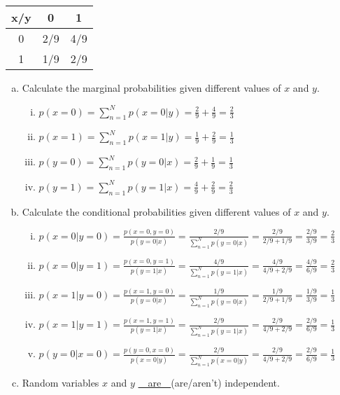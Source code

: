 \documentclass[11pt]{article} %
\begin{document}
\begin{center}
\begin{tabular}{c | c c}
x/y & 0 & 1 \\
\hline
0 & 2/9 & 4/9 \\
1 & 1/9 & 2/9
\end{tabular}
\end{center}

\begin{enumerate}[(a)]
\item Calculate the marginal probabilities given different values of $x$ and $y$.
\begin{enumerate}[i. ]
\item $p(x = 0) = \sum_{n=1}^{N} p(x=0|y) = \frac{2}{9} + \frac{4}{9} = \frac{2}{3}$
\item $p(x=1) = \sum_{n=1}^{N} p(x=1|y) = \frac{1}{9} + \frac{2}{9} = \frac{1}{3}$
\item $p(y=0) = \sum_{n=1}^{N} p(y=0|x) = \frac{2}{9} + \frac{1}{9} = \frac{1}{3}$
\item $p(y=1) = \sum_{n=1}^{N} p(y=1|x) = \frac{4}{9} + \frac{2}{9} = \frac{2}{3}$
\end{enumerate}
\item Calculate the conditional probabilities given different values of $x$ and $y$.
\begin{enumerate}[i. ]
\item $p(x=0|y=0) = \frac{p(x=0,y=0)}{p(y=0|x)} = \frac{2/9}{\sum_{n=1}^{N} p(y=0|x)} = \frac{2/9}{2/9 + 1/9} = \frac{2/9}{3/9} = \frac{2}{3}$
\item $p(x=0|y=1) = \frac{p(x=0,y=1)}{p(y=1|x)} = \frac{4/9}{\sum_{n=1}^{N} p(y=1|x)} = \frac{4/9}{4/9 + 2/9} = \frac{4/9}{6/9} = \frac{2}{3}$
\item $p(x=1|y=0) = \frac{p(x=1,y=0)}{p(y=0|x)} = \frac{1/9}{\sum_{n=1}^{N} p(y=0|x)} = \frac{1/9}{2/9 + 1/9} = \frac{1/9}{3/9} = \frac{1}{3}$
\item $p(x=1|y=1) = \frac{p(x=1,y=1)}{p(y=1|x)} = \frac{2/9}{\sum_{n=1}^{N} p(y=1|x)} = \frac{2/9}{4/9 + 2/9} = \frac{2/9}{6/9} = \frac{1}{3}$
\item $p(y=0|x=0) = \frac{p(y=0,x=0)}{p(x=0|y)} = \frac{2/9}{\sum_{n=1}^{N} p(x=0|y)} = \frac{2/9}{4/9 + 2/9} = \frac{2/9}{6/9} = \frac{1}{3}$
\end{enumerate}
\item Random variables $x$ and $y$ \underline{~~are~~}(are/aren't) independent.
\end{enumerate}
\end{document}
